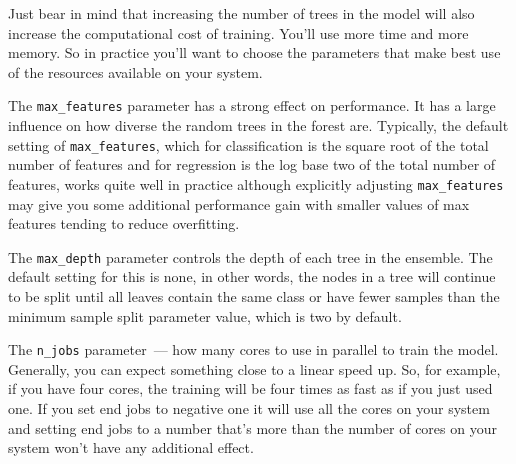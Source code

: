 \begin{multicols}{2}
Just bear in mind that increasing the number of trees in the model will also increase the computational cost of training. You'll use more time and more memory. So in practice you'll want to choose the parameters that make best use of the resources available on your system. 

The \texttt{max_features} parameter has a strong effect on performance. It has a large influence on how diverse the random trees in the forest are. Typically, the default setting of \texttt{max_features}, which for classification is the square root of the total number of features and for regression is the log base two of the total number of features, works quite well in practice although explicitly adjusting \texttt{max_features} may give you some additional performance gain with smaller values of max features tending to reduce overfitting. 

The \texttt{max_depth} parameter controls the depth of each tree in the ensemble. The default setting for this is none, in other words, the nodes in a tree will continue to be split until all leaves contain the same class or have fewer samples than the minimum sample split parameter value, which is two by default. 

The \texttt{n_jobs} parameter~--- how many cores to use in parallel to train the model. Generally, you can expect something close to a linear speed up. So, for example, if you have four cores, the training will be four times as fast as if you just used one. If you set end jobs to negative one it will use all the cores on your system and setting end jobs to a number that's more than the number of cores on your system won't have any additional effect. 

\end{multicols}